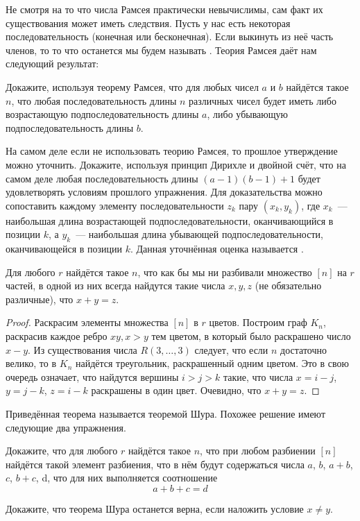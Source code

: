 Не смотря на то что числа Рамсея практически невычислимы, сам факт их существования может иметь следствия. Пусть у нас есть некоторая последовательность (конечная или бесконечная). Если выкинуть из неё часть членов, то то что останется мы будем называть . Теория Рамсея даёт нам следующий результат:

\begin{exercise}
Докажите, используя теорему Рамсея, что для любых чисел $a$ и $b$ найдётся такое $n$, что любая последовательность длины $n$ различных чисел  будет иметь либо возрастающую подпоследовательность длины $a$, либо убывающую подпоследовательность длины $b$.
\end{exercise}

\begin{exercise}
На самом деле если не использовать теорию Рамсея, то прошлое утверждение можно уточнить. Докажите, используя принцип Дирихле и двойной счёт, что на самом деле любая последовательность длины $(a-1)(b-1)+1$ будет удовлетворять условиям прошлого упражнения. Для доказательства можно сопоставить каждому элементу последовательности $z_k$ пару $(x_k, y_k)$, где $x_k$~--- наибольшая длина возрастающей подпоследовательности, оканчивающийся в позиции $k$, а $y_k$~--- наибольшая длина убывающей подпоследовательности, оканчивающейся в позиции $k$. Данная уточнённая оценка называется .
\end{exercise}

\begin{thm}
Для любого $r$ найдётся такое $n$, что как бы мы ни разбивали множество $[n]$ на $r$ частей, в одной из них всегда найдутся такие числа $x, y, z$ (не обязательно различные), что $x+y=z$.
\end{thm}
\begin{proof}
Раскрасим элементы множества $[n]$ в $r$ цветов. Построим граф $K_n$, раскрасив каждое ребро $xy, x>y$ тем цветом, в который было раскрашено число $x-y$. Из существования числа $R(3, \ldots, 3)$ следует, что если $n$ достаточно велико, то в $K_n$ найдётся треугольник, раскрашенный одним цветом. Это в свою очередь означает, что найдутся вершины $i> j> k$ такие, что числа $x=i-j$, $y=j-k$, $z=i-k$ раскрашены в один цвет. Очевидно, что $x + y = z$.
\end{proof}

Приведённая теорема называется теоремой Шура. Похожее решение имеют следующие два упражнения.

\begin{exercise}
Докажите, что для любого $r$ найдётся такое $n$, что при любом разбиении $[n]$ найдётся такой элемент разбиения, что в нём будут содержаться числа $a$, $b$, $a+b$, $c$, $b+c$, d, что для них выполняется соотношение
$$a+b+c = d$$
\end{exercise}

\begin{exercise}
Докажите, что теорема Шура останется верна, если наложить условие $x\not= y$.
\end{exercise}
